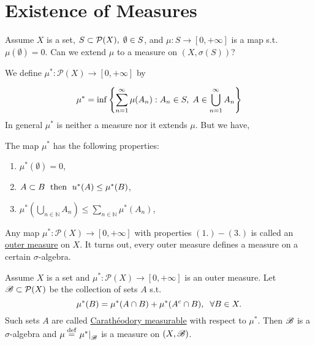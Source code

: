 \section{Existence of Measures}

Assume $X$ is a set, $S\subset \mathcal P(X),\hspace{1mm} \emptyset\in S$, and $\mu:S\rightarrow [0,+\infty]$ is a map s.t. $\mu(\emptyset)=0$. Can we extend $\mu$ to a measure on
$(X,\sigma(S))$?

We define $\mu^*:\mathcal P(X)\rightarrow [0,+\infty]$ by 

\[\mu^*=\inf\left\{\sum_{n=1}^\infty \mu(A_n): A_n\in S,\hspace{1mm} A\in \bigcup_{n=1}^\infty A_n\right\}\]
In general $\mu^*$ is neither a measure nor it extends $\mu$. But we have, 
\begin{lemma}
    
    The map $\mu^*$ has the following properties: 
    \begin{enumerate}
        \item \(\mu^{*}(\emptyset) = 0\),
        \item \(A\subset B \hspace{1mm}\text{ then }\hspace{1mm} u^{*}(A) \leq \mu^{*}(B)\),
        \item \(\mu^{*}\left( \bigcup\limits_{n\in\mathbb{N}} A_n \right)\leq \sum\limits_{n\in\mathbb{N}} \mu^{*}(A_n)\),
    \end{enumerate}
\end{lemma}
Any map $\mu^*:\mathcal P(X)\rightarrow [0,+\infty]$ with properties $(1.)-(3.)$ is called an \underline{outer measure} on $X$. It turns out, every 
outer measure defines a measure on a certain $\sigma$-algebra.

\begin{theorem}
    Assume $X$ is a set and $\mu^*:\mathcal P(X)\rightarrow [0,+\infty]$ is an outer measure. Let $\mathscr{B}\subset\mathcal P(X)$ be the collection 
    of sets $A$ s.t. \[\mu^*(B)=\mu^*(A\cap B)+\mu^*(A^c\cap B),\hspace{2mm} \forall B\in X.\]
    Such sets $A$ are called \underline{Carathéodory measurable} with respect to $\mu^*$. Then $\mathscr{B}$ is a $\sigma$-algebra and $\mu\stackrel{\text{def}}{=} \left.\mu^*\right|_{\mathscr{B}}$ is a 
    measure on $(X,\mathscr{B})$.
\end{theorem}


    